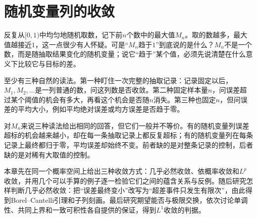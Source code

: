 \chapter{随机变量列的收敛}
\label{chap:random-variable-convergence}

反复从$[0,1)$中均匀地随机取数，记下前$n$个数中的最大值$M_n$。取的数越多，最大值越接近$1$，这一点很少有人怀疑。可是“$M_n$趋于$1$”到底说的是什么？$M_n$不是一个数，而是随抽取结果变化的随机变量；说它“趋于”某个值，必须先说清楚在什么意义下比较它与目标的差。

至少有三种自然的读法。第一种盯住一次完整的抽取记录：记录固定以后，$M_1,M_2,\dots$是一列普通的数，问这列数是否收敛。第二种固定样本量$n$，问误差超过某个阈值的机会有多大，再看这个机会是否随$n$消失。第三种也固定$n$，但问误差的平均大小，例如平均绝对误差或均方误差是否趋于零。

对$M_n$来说三种读法给出相同的回答，但它们一般并不等价。有的随机变量列误差超标的机会越来越小，却在每一条抽取记录上都反复超标；有的随机变量列在每条记录上最终都归于零，平均误差却始终不变。前者缺的是对整条记录的控制，后者缺的是对稀有大取值的控制。

本章先在同一个概率空间上给出三种收敛方式：几乎必然收敛、依概率收敛和$L^{p}$收敛，并用几个可以手算的例子逐一检验它们之间的蕴含关系与反例。随后研究怎样判断几乎必然收敛：把“误差最终变小”改写为“超差事件只发生有限次”，由此得到Borel–Cantelli引理和子列刻画。最后研究期望能否与极限交换，依次讨论单调性、共同上界和一致可积性各自提供的保证，得到$L^{1}$收敛的判据。










